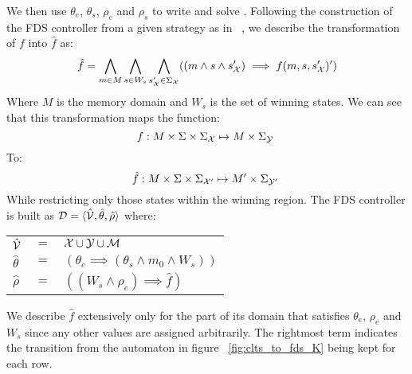 We then use $\theta_e$, $\theta_s$, $\rho_e$ and $\rho_s$ to write \varphiLTL and solve \fdsEmbeddingDef. Following the construction of the FDS controller from a given strategy as in ~\cite{bloem2012synthesis}, we describe the transformation of $f$ into $\hat{f}$ as:
\[\hat{f} = \bigwedge_{m \in M}\bigwedge_{s \in W_s}\bigwedge_{s'_{{\mathcal{X}}} \in \Sigma_{{\mathcal{X}}}} ((m \wedge s \wedge s'_{{\mathcal{X}}})\implies f(m,s,s'_{{\mathcal{X}}})')\]
Where $M$ is the memory domain and $W_s$ is the set of winning states. We can see that this transformation maps the function:
\[f: M \times \Sigma \times \Sigma_{{\mathcal{X}}} \mapsto M \times \Sigma_{{\mathcal{Y}}}\ \]
To:
\[\hat{f}: M \times \Sigma \times \Sigma_{{\mathcal{X}}'} \mapsto M' \times \Sigma_{{\mathcal{Y}}'}\ \]
While restricting only those states within the winning region.
The FDS controller is built as $\mathcal{D} = \langle \hat{{\mathcal{V}}}, \hat{\theta}, \hat{\rho} \rangle$ where:

\vspace{1em}
\begin{tabular}{ l c l }
	$\hat{{\mathcal{V}}}$ & $=$ & ${\mathcal{X}} \cup {\ensuremath{\mathcal{Y}}} \cup \mathcal{M}$\\	
	$\hat{\theta}$ & $=$ & $(\theta_e \implies (\theta_s \wedge m_0 \wedge W_s))$\\
	$\hat{\rho}$ & $=$ & $((W_s \wedge \rho_e) \implies \hat{f})$\\	
\end{tabular}
\vspace{1em}

We describe $\hat{f}$ extensively only for the part of its domain that satisfies $\theta_e$, $\rho_e$ and $W_s$ since any other values are assigned arbitrarily. The rightmost term indicates the transition from the automaton in figure ~\ref{fig:clts_to_fds_K} being kept for each row. 

